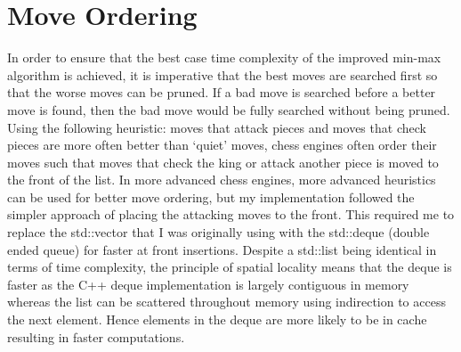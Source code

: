 \section{Move Ordering}
In order to ensure that the best case time complexity of the improved min-max algorithm is achieved, it is imperative that the best moves are searched first so that the worse moves can be pruned. If a bad move is searched before a better move is found, then the bad move would be fully searched without being pruned. Using the following heuristic: moves that attack pieces and moves that check pieces are more often better than `quiet' moves, chess engines often order their moves such that moves that check the king or attack another piece is moved to the front of the list. In more advanced chess engines, more advanced heuristics can be used for better move ordering, but my implementation followed the simpler approach of placing the attacking moves to the front. This required me to replace the std::vector that I was originally using with the std::deque (double ended queue) for faster at front insertions. Despite a std::list being identical in terms of time complexity, the principle of spatial locality means that the deque is faster as the C++ deque implementation is largely contiguous in memory whereas the list can be scattered throughout memory using indirection to access the next element. Hence elements in the deque are more likely to be in cache resulting in faster computations.
